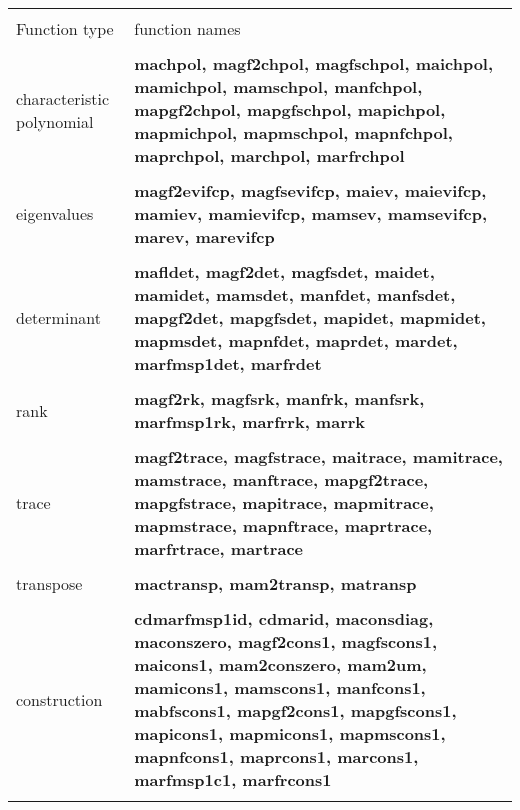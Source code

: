 \leer
\begin{center}
\begin{tabular}{|p{1.1in}|p{4.0in}|}
\hline &\\[-1.3ex]
Function type  &
function names\\[1.5ex]
\hline &\\[-1.3ex]

characteristic \newline
polynomial &
{\bf machpol, magf2chpol, magfschpol, maichpol, \newline
mamichpol, mamschpol, manfchpol,
mapgf2chpol, mapgfschpol, mapichpol, mapmichpol, mapmschpol, mapnfchpol,
maprchpol, marchpol, marfrchpol} \\[1.5ex]
\hline &\\[-1.3ex]

eigenvalues &
{\bf magf2evifcp, magfsevifcp, maiev, maievifcp, mamiev, mamievifcp, mamsev,
        mamsevifcp, marev, marevifcp} \\[1.5ex]
\hline &\\[-1.3ex]

determinant & 
{\bf mafldet, magf2det, magfsdet, maidet, mamidet, \newline
mamsdet, manfdet, manfsdet,
mapgf2det, mapgfsdet, mapidet, mapmidet, mapmsdet, mapnfdet, maprdet, mardet,
marfmsp1det, marfrdet} \\[1.5ex]
\hline &\\[-1.3ex]

rank & 
{\bf magf2rk, magfsrk, manfrk, manfsrk, marfmsp1rk, marfrrk, marrk} \\[1.5ex]
\hline &\\[-1.3ex]

trace & 
{\bf magf2trace, magfstrace, maitrace, mamitrace, \newline
mamstrace, manftrace, 
mapgf2trace, mapgfstrace, mapitrace, mapmitrace, mapmstrace, mapnftrace,
maprtrace, marfrtrace, martrace }\\[1.5ex]
\hline &\\[-1.3ex]

transpose & 
{\bf mactransp, mam2transp, matransp} \\[1.5ex]
\hline &\\[-1.3ex]

construction & 
{\bf cdmarfmsp1id, cdmarid, maconsdiag, maconszero, magf2cons1, magfscons1, 
maicons1, mam2conszero, mam2um, mamicons1, mamscons1, manfcons1, \newline
mabfscons1, 
mapgf2cons1, mapgfscons1, mapicons1, mapmicons1, mapmscons1, mapnfcons1, 
maprcons1, marcons1, marfmsp1c1, marfrcons1} \\[1.5ex]
\hline &\\[-1.3ex]


\end{tabular}
\end{center}
